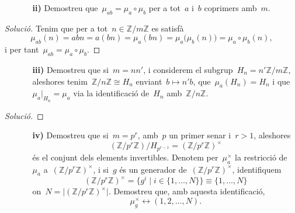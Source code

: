 \documentclass[a4paper]{article}
\newcommand{\ZZ}{\mathbb{Z}}
\newenvironment{solution}{
    \renewcommand\qedsymbol{\ensuremath{\lozenge}}
    \begin{proof}[Solució]
        }{
    \end{proof}
}
\begin{document}
\begin{enumerate}
    \item[] \begin{enumerate}
        \item[\textbf{ii)}] Demostreu que~\(\mu_{ab} = \mu_{a}\circ\mu_{b}\) per
            a tot~\(a\) i~\(b\) coprimers amb~\(m\).
    \end{enumerate}
\end{enumerate}

\begin{solution}
    Tenim que per a tot~\(n\in\ZZ/m\ZZ\) es satisfà
    \[
        \mu_{ab}(n)
        = abn
        = a(bn)
        = \mu_{a}(bn)
        = \mu_{a}\bigl(\mu_{b}(n)\bigr)
        = \mu_{a}\circ\mu_{b}(n),
    \]
    i per tant~\(\mu_{ab} = \mu_{a}\circ\mu_{b}\).
\end{solution}

\begin{enumerate}
    \item[] \begin{enumerate}
        \item[\textbf{iii)}] Demostreu que si~\(m=nn'\),
            i considerem el subgrup~\(H_{n}=n'\ZZ/m\ZZ\),
            aleshores tenim~\(\ZZ/n\ZZ \cong H_{n}\)
            enviant~\(b\mapsto n'b\),
            que~\(\mu_{a}(H_{n})=H_{n}\)
            i que~\(\mu_{a}\rvert_{H_{n}}=\mu_{a}\)
            via la identificació de~\(H_{n}\)
            amb~\(\ZZ/n\ZZ\).
    \end{enumerate}
\end{enumerate}

\begin{solution}
\end{solution}

\begin{enumerate}
    \item[] \begin{enumerate}
        \item[\textbf{iv)}] Demostreu que si~\(m=p^{r}\),
            amb~\(p\) un primer senar
            i~\(r>1\), aleshores
            \[
                (\ZZ/p^{r}\ZZ)/H_{p^{r-1}} = (\ZZ/p^{r}\ZZ)^{\times}
            \]
            és el conjunt dels elements invertibles.
            Denotem per~\(\mu_{a}^{\times}\)
            la restricció de~\(\mu_{a}\) a~\((\ZZ/p^{r}\ZZ)^{\times}\),
            i si~\(g\) és un generador de~\((\ZZ/p^{r}\ZZ)^{\times}\),
            identifiquem
            \[
                (\ZZ/p^{r}\ZZ)^{\times}
                =
                \{ g^{i} \mid i\in \{1,\dots,N\}\}
                \equiv
                \{1,\dots,N\}
            \]
            on~\(N = \lvert(\ZZ/p^{r}\ZZ)^{\times}\rvert\).
            Demostreu que, amb aquesta identificació,
            \[
                \mu_{g}^{\times} \leftrightarrow (1,2,\dots,N).
            \]
    \end{enumerate}
\end{enumerate}
\end{document}
